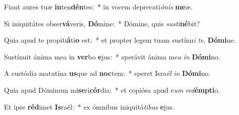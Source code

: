 \item Fiant aures tuæ \textbf{in}ten\textbf{dén}tes:~* in vocem deprecati\textit{ó}\textit{nis} \textbf{me}æ.
\item Si iniquitátes obser\textbf{vá}veris, \textbf{Dó}mine:~* Dómine, quis \textit{sus}\textit{ti}\textbf{né}bit?
\item Quia apud te propiti\textbf{á}ti\textbf{o} est:~* et propter legem tuam sustínu\textit{i} \textit{te}, \textbf{Dó}\textbf{mi}ne.
\item Sustínuit ánima mea in \textbf{ver}bo \textbf{e}jus:~* sperávit ánima me\textit{a} \textit{in} \textbf{Dó}\textbf{mi}no.
\item A custódia matutína \textbf{us}que ad \textbf{noc}tem:~* speret Isra\textit{ël} \textit{in} \textbf{Dó}\textbf{mi}no.
\item Quia apud Dóminum mi\textbf{se}ri\textbf{cór}dia:~* et copiósa apud e\textit{um} \textit{red}\textbf{émp}\textbf{ti}o.
\item Et ipse \textbf{réd}imet \textbf{Is}raël:~* ex ómnibus iniquitá\textit{ti}\textit{bus} \textbf{e}jus.
